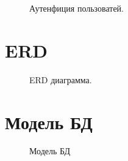 \documentclass[a4paper,12pt]{article}
\begin{document}
\begin{figure}[h]

	\begin{minipage}[h]{1\linewidth}
		\caption{ Аутенфиция пользоватей.}
	\end{minipage}

	
\end{figure}



\clearpage
\section{ERD}

\begin{figure}[h]

	\begin{minipage}[h]{1\linewidth}
		\caption{ ERD диаграмма.}
	\end{minipage}
	
\end{figure}

\clearpage
\section{Модель БД}

\begin{figure}[h]
	
	\begin{minipage}[h]{1\linewidth}
		\caption{Модель БД}
	\end{minipage}
	
\end{figure}
\end{document}
